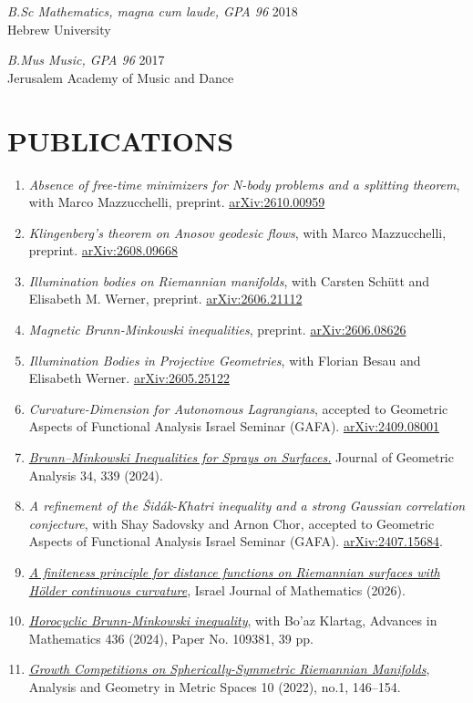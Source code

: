\documentclass[margin, 10pt]{res}
\begin{document}
\begin{resume}
{\sl B.Sc Mathematics, magna cum laude, GPA 96} \hfill 2018 \\
{Hebrew University}

{\sl B.Mus Music, GPA 96} \hfill 2017 \\
{Jerusalem Academy of Music and Dance}

\section{PUBLICATIONS}

\begin{enumerate}
    \item \textit{Absence of free-time minimizers for N-body problems and a splitting theorem}, with Marco Mazzucchelli, preprint. \href{https://arxiv.org/abs/2610.00959}{arXiv:2610.00959}
    \item \textit{Klingenberg's theorem on Anosov geodesic flows}, with Marco Mazzucchelli, preprint. \href{https://arxiv.org/abs/2608.09668}{arXiv:2608.09668}
    \item \textit{Illumination bodies on Riemannian manifolds}, with Carsten Schütt and Elisabeth M. Werner, preprint. \href{https://arxiv.org/abs/2606.21112}{arXiv:2606.21112}
    \item \textit{Magnetic Brunn-Minkowski inequalities}, preprint. \href{https://arxiv.org/abs/2606.08626}{arXiv:2606.08626}
    \item \textit{Illumination Bodies in Projective Geometries}, with Florian Besau and Elisabeth Werner. \href{https://arxiv.org/abs/2605.25122}{arXiv:2605.25122}
    \item \textit{Curvature-Dimension for Autonomous Lagrangians}, accepted to Geometric Aspects of Functional Analysis
    Israel Seminar (GAFA). \href{https://arxiv.org/abs/2409.08001}{arXiv:2409.08001}
    \item \href{https://doi.org/10.1007/s12220-024-01792-6}{\textit{Brunn–Minkowski Inequalities for Sprays on Surfaces.}} Journal of Geometric  Analysis 34, 339 (2024).
    \item \textit{A refinement of the Šidák-Khatri inequality and a strong Gaussian correlation conjecture}, with Shay Sadovsky and Arnon Chor, accepted to Geometric Aspects of Functional Analysis
    Israel Seminar (GAFA). \href{https://arxiv.org/abs/2407.15684}{arXiv:2407.15684}.
    \item \href{https://doi.org/10.1007/s11856-026-2935-2}{\textit{A finiteness principle for distance functions on Riemannian surfaces with Hölder continuous curvature}}, Israel Journal of Mathematics (2026).
    \item \href{https://doi.org/10.1016/j.aim.2023.109381}{\textit{Horocyclic Brunn-Minkowski inequality}}, with Bo'az Klartag, Advances in  Mathematics 436 (2024), Paper No. 109381, 39 pp.
    \item \href{https://doi.org/10.1515/agms-2022-0139}{\textit{Growth Competitions on Spherically-Symmetric Riemannian Manifolds}}, Analysis and Geometry in Metric Spaces 10 (2022), no.1, 146–154.
\end{enumerate}


\end{resume}
\end{document}
